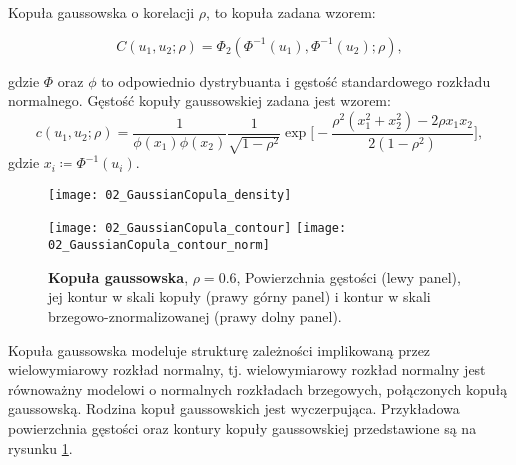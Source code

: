 \begin{df}
	Kopuła gaussowska o korelacji $\rho$, to kopuła zadana wzorem:
	
	$$ C(u_1, u_2; \rho) = \Phi_2(\Phi^{-1}(u_1), \Phi^{-1}(u_2);\rho),$$
	
	gdzie $\Phi$ oraz $\phi$ to odpowiednio dystrybuanta i gęstość standardowego rozkładu normalnego. Gęstość kopuły gaussowskiej zadana jest wzorem:
	$$ c(u_1, u_2; \rho) = \frac{1}{\phi(x_1)\phi(x_2)} \frac{1}{\sqrt{1-\rho^2}}\exp\bigg[-\frac{\rho^2(x_1^2+x_2^2) - 2\rho x_1 x_2}{2(1-\rho^2)}\bigg],$$
	gdzie $x_i\coloneqq \Phi^{-1}(u_i)$.
\end{df}
\begin{figure}[h]
	\centering
	\begin{minipage}{0.5\linewidth}
		\texttt{[image: 02\_GaussianCopula\_density]}
	\end{minipage}
	\begin{minipage}{0.45\linewidth}
		\texttt{[image: 02\_GaussianCopula\_contour]}
		\texttt{[image: 02\_GaussianCopula\_contour\_norm]}
	\end{minipage}
	\caption{\textbf{Kopuła gaussowska}, $\rho=0.6$, Powierzchnia gęstości (lewy panel), jej kontur w skali kopuły (prawy górny panel) i kontur w skali brzegowo-znormalizowanej (prawy dolny panel). \label{fig:gaussian_copula_density}}
\end{figure}

Kopuła gaussowska modeluje strukturę zależności implikowaną przez wielowymiarowy rozkład normalny, tj. wielowymiarowy rozkład normalny jest równoważny modelowi o normalnych rozkładach brzegowych, połączonych kopułą gaussowską. Rodzina kopuł gaussowskich jest wyczerpująca. Przykładowa powierzchnia gęstości oraz kontury kopuły gaussowskiej przedstawione są na rysunku \ref{fig:gaussian_copula_density}.

